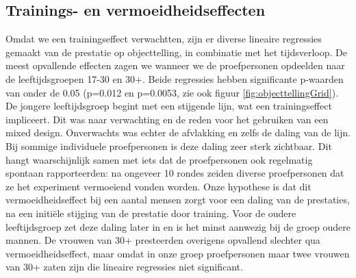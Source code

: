 \documentclass[a4paper,jou]{apa6}  %
\begin{document}
\subsection{Trainings- en vermoeidheidseffecten}
Omdat we een trainingseffect verwachtten, zijn er diverse lineaire regressies gemaakt van de prestatie op objecttelling, in combinatie met het tijdsverloop. De meest opvallende effecten zagen we wanneer we de proefpersonen opdeelden naar de leeftijdsgroepen 17-30 en 30+. Beide regressies hebben significante p-waarden van onder de 0.05 (p=0.012 en p=0.0053, zie ook figuur \ref{fig:objecttellingGrid}). De jongere leeftijdsgroep begint met een stijgende lijn, wat een trainingseffect impliceert. Dit was naar verwachting en de reden voor het gebruiken van een mixed design. Onverwachts was echter de afvlakking en zelfs de daling van de lijn. Bij sommige individuele proefpersonen is deze daling zeer sterk zichtbaar. Dit hangt waarschijnlijk samen met iets dat de proefpersonen ook regelmatig spontaan rapporteerden: na ongeveer 10 rondes zeiden diverse proefpersonen dat ze het experiment vermoeiend vonden worden. Onze hypothese is dat dit vermoeidheidseffect bij een aantal mensen zorgt voor een daling van de prestaties, na een initiële stijging van de prestatie door training. Voor de oudere leeftijdsgroep zet deze daling later in en is het minst aanwezig bij de groep oudere mannen. De vrouwen van 30+ presteerden overigens opvallend slechter qua vermoeidheidseffect, maar omdat in onze groep proefpersonen maar twee vrouwen van 30+ zaten zijn die lineaire regressies niet significant.
\end{document}
